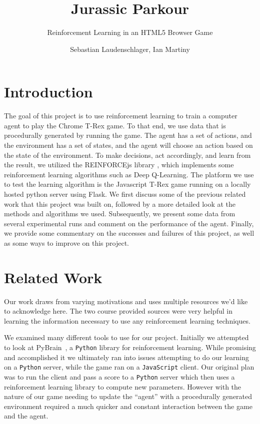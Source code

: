\documentclass{scrartcl}
\title{Jurassic Parkour}
\subtitle{Reinforcement Learning in an HTML5 Browser Game}
\author{Sebastian Laudenschlager, Ian Martiny}
\begin{document}
\maketitle

\section{Introduction}

The goal of this project is to use reinforcement learning to train a computer agent to play the Chrome T-Rex game. To that end, we use data that is procedurally generated by running the game. The agent has a set of actions, and the environment has a set of states, and the agent will choose an action based on the state of the environment. To make decisions, act accordingly, and learn from the result, we utilized the REINFORCEjs library \cite{reinforcejs}, which implements some reinforcement learning algorithms such as Deep Q-Learning. The platform we use to test the learning algorithm is the Javascript T-Rex game running on a locally hosted python server using Flask. We first discuss some of the previous related work that this project was built on, followed by a more detailed look at the methods and algorithms we used. Subsequently, we present some data from several experimental runs and comment on the performance of the agent. Finally, we provide some commentary on the successes and failures of this project, as well as some ways to improve on this project.

\section{Related Work}
Our work draws from varying motivations and uses multiple resources we'd like to
acknowledge here. The two course provided sources \cite{rltutorial, rlblog} were
very helpful in learning the information necessary to use any reinforcement
learning techniques.

We examined many different tools to use for our project. Initially we attempted
to look at PyBrain~\cite{pybrain}, a \texttt{Python} library for reinforcement
learning. While promising and accomplished it we ultimately ran into issues
attempting to do our learning on a \texttt{Python} server, while the game ran on
a \texttt{JavaScript} client. Our original plan was to run the client and pass
a score to a \texttt{Python} server which then uses a reinforcement learning
library to compute new parameters. However with the nature of our game needing
to update the ``agent'' with a procedurally generated environment required a
much quicker and constant interaction between the game and the agent.
\end{document}

